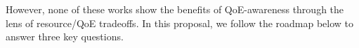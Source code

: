 However, none of these works show the benefits of QoE-awareness through the lens of resource/QoE tradeoffs. 
In this proposal, we follow the roadmap below to answer three key questions.


\vspace{0.2cm}

\vspace{0.2cm}

\vspace{0.2cm}






